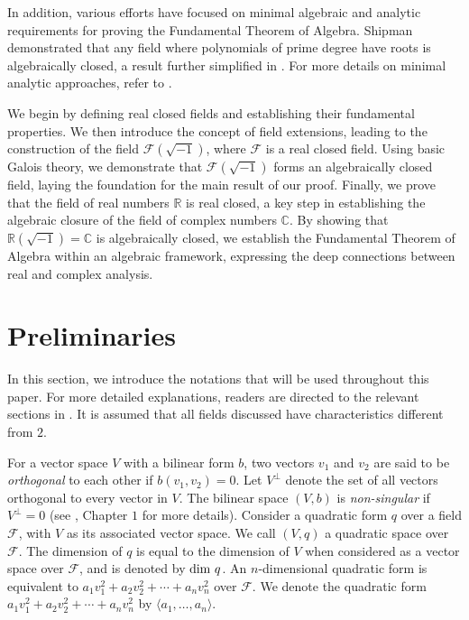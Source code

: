 \documentclass[sn-mathphys-num]{sn-jnl}%
\begin{document}
  In addition, various efforts have focused on minimal algebraic and analytic requirements for proving the Fundamental Theorem of Algebra. Shipman \cite{shipman} demonstrated that any field where polynomials of prime degree have roots is algebraically closed, a result further simplified in \cite{aliabadi}. For more details on minimal analytic approaches, refer to \cite{basu}.


\medskip 

We begin by defining real closed fields and establishing their fundamental properties. We then introduce the concept of field extensions, leading to the construction of the field $\mathcal F(\sqrt{-1})$, where $\mathcal F$ is a real closed field. Using basic Galois theory, we demonstrate that $\mathcal F(\sqrt{-1})$ forms an algebraically closed field, laying the foundation for the main result of our proof.
Finally, we prove that the field of real numbers $\mathbb R$ is real closed, a key step in establishing the algebraic closure of the field of complex numbers $\mathbb C$. By showing that $\mathbb R(\sqrt{-1})=\mathbb C$ is algebraically closed, we establish the Fundamental Theorem of Algebra within an algebraic framework, expressing the deep connections between real and complex analysis.

\medskip 




\section{Preliminaries}\label{prelim}
In this section, we introduce the notations that will be used throughout this paper. For more detailed explanations, readers are directed to the relevant sections in \cite{lam}. It is assumed that all fields discussed have characteristics different from $2$. 
\medskip 

For a vector space $V$ with a bilinear form $b$, two vectors $v_1$ and $v_2$ are said to be {\it orthogonal} to each other if $b(v_1,v_2)=0$. Let $V^\perp$ denote the set of all vectors orthogonal to every vector in $V$. The bilinear space $(V,b)$ is {\it non-singular} if $V^\perp=0$ (see \cite{sch}, Chapter $1$ for more details).
Consider a quadratic form $q$ over a field $\mathcal F$, with $V$ as its associated vector space. We call $(V,q)$ a { quadratic space} over $\mathcal F$. The dimension of $q$ is equal to the dimension of $V$ when considered as a vector space over $\mathcal F$, and is denoted by ${\rm dim}\ q$. An $n$-dimensional quadratic form is equivalent to $a_1v_1^2+a_2v_2^2+ \cdots +a_nv_n^2$ over $\mathcal F$. We denote the quadratic form $a_1v_1^2+a_2v_2^2+ \cdots +a_nv_n^2$ by $\langle a_1,\ldots,a_n\rangle$.
\medskip 
\end{document}
